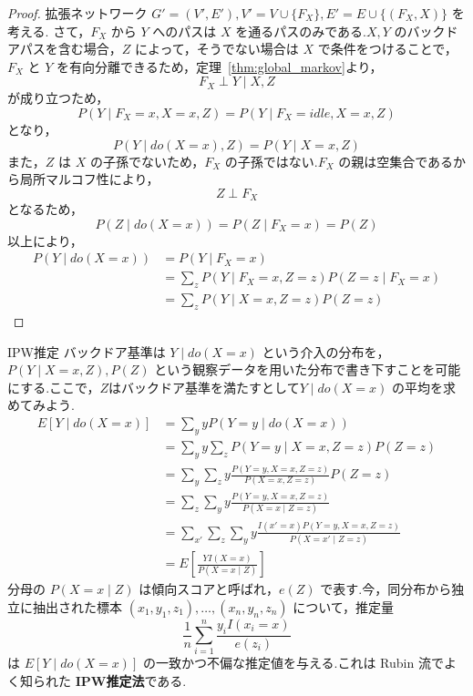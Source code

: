 \documentclass[uplatex, dvipdfmx]{jsarticle}
\begin{document}
\begin{proof}
  拡張ネットワーク $G' = (V', E'), V' = V \cup \{F_X\}, E' = E \cup \{(F_X, X)\}$ を考える.
  さて，$F_X$ から $Y$ へのパスは $X$ を通るパスのみである.$X, Y$ のバックドアパスを含む場合，$Z$ によって，そうでない場合は $X$ で条件をつけることで，$F_X$ と $Y$ を有向分離できるため，定理~\ref{thm:global_markov}より，
  \begin{equation}
    F_X \perp Y \mid X, Z
  \end{equation}
  が成り立つため，
  \begin{equation}
    P(Y \mid F_X=x, X=x, Z) = P(Y \mid F_X=idle, X=x, Z)
  \end{equation}
  となり，
  \begin{equation}
    P(Y \mid do(X=x), Z) = P(Y \mid X=x, Z)
  \end{equation}
  また，$Z$ は $X$ の子孫でないため，$F_X$ の子孫ではない.$F_X$ の親は空集合であるから局所マルコフ性により，
  \begin{equation}
    Z \perp F_X
  \end{equation}
  となるため，
  \begin{equation}
    P(Z \mid do(X=x)) = P(Z \mid F_X=x) = P(Z)
  \end{equation}
  以上により，
  \begin{align}
    P(Y \mid do(X=x)) &= P(Y \mid F_X=x)  \\
    &= \sum_z P(Y \mid F_X=x, Z=z) P(Z=z \mid F_X=x)  \\
    &= \sum_z P(Y \mid X=x, Z=z) P(Z=z)
  \end{align}
\end{proof}

\begin{exm}{IPW推定}
  バックドア基準は $Y \mid do(X=x)$ という介入の分布を，$P(Y \mid X=x, Z),P(Z)$ という観察データを用いた分布で書き下すことを可能にする.ここで，$Z$はバックドア基準を満たすとして$Y \mid do(X=x)$ の平均を求めてみよう.
  \begin{align}
    E[Y \mid do(X=x)] &= \sum_y y P(Y=y \mid do(X=x))  \\
    &= \sum_y y \sum_z P(Y=y \mid X=x, Z=z) P(Z=z)  \\
    &= \sum_y \sum_z y \frac{P(Y=y, X=x, Z=z)}{P(X=x, Z=z)}P(Z=z)  \\
    &= \sum_z \sum_y y \frac{P(Y=y, X=x, Z=z)}{P(X=x \mid Z=z)}  \\
    &= \sum_{x'} \sum_z \sum_y y \frac{I(x'=x)P(Y=y, X=x, Z=z)}{P(X=x' \mid Z=z)}  \\
    &= E\left[\frac{YI(X=x)}{P(X=x \mid Z)}\right]
  \end{align}
  分母の $P(X=x \mid Z)$ は傾向スコアと呼ばれ，$e(Z)$ で表す.今，同分布から独立に抽出された標本 $(x_1, y_1, z_1), \dots, (x_n, y_n, z_n)$ について，推定量
  \begin{equation}
    \frac{1}{n} \sum_{i=1}^n \frac{y_i I(x_i=x)}{e(z_i)}
  \end{equation}
  は $E[Y \mid do(X=x)]$ の一致かつ不偏な推定値を与える.これは Rubin 流でよく知られた \textbf{IPW推定法}である.
\end{exm}
\end{document}
